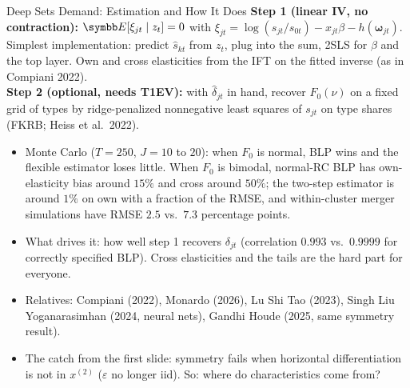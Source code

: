 \documentclass[aspectratio=169,10pt]{beamer}
\begin{document}
\begin{frame}{Deep Sets Demand: Estimation and How It Does}
\small
\textbf{Step 1 (linear IV, no contraction):} $\E[\xi_{jt} \mid z_t]=0$ with $\xi_{jt} = \log(s_{jt}/s_{0t}) - x_{jt}\beta - h(\symbf{\omega}_{jt})$. Simplest implementation: predict $\hat{s}_{kt}$ from $z_t$, plug into the sum, 2SLS for $\beta$ and the top layer. Own and cross elasticities from the IFT on the fitted inverse (as in Compiani 2022).\\
\textbf{Step 2 (optional, needs T1EV):} with $\hat{\delta}_{jt}$ in hand, recover $F_0(\nu)$ on a fixed grid of types by ridge-penalized nonnegative least squares of $s_{jt}$ on type shares (FKRB; Heiss et al.\ 2022).
\begin{itemize}
\item Monte Carlo ($T=250$, $J=10$ to $20$): when $F_0$ is normal, BLP wins and the flexible estimator loses little. When $F_0$ is bimodal, normal-RC BLP has own-elasticity bias around $15\%$ and cross around $50\%$; the two-step estimator is around $1\%$ on own with a fraction of the RMSE, and within-cluster merger simulations have RMSE $2.5$ vs.\ $7.3$ percentage points.
\item What drives it: how well step 1 recovers $\delta_{jt}$ (correlation $0.993$ vs.\ $0.9999$ for correctly specified BLP). Cross elasticities and the tails are the hard part for everyone.
\item Relatives: Compiani (2022), Monardo (2026), Lu Shi Tao (2023), Singh Liu Yoganarasimhan (2024, neural nets), Gandhi Houde (2025, same symmetry result).
\item The catch from the first slide: symmetry fails when horizontal differentiation is \alert{not in} $x^{(2)}$ ($\varepsilon$ no longer iid). So: where do characteristics come from?
\end{itemize}
\end{frame}
\end{document}
